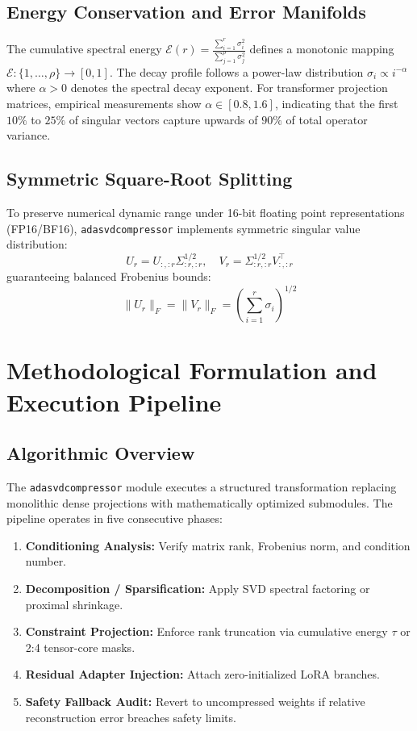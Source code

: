 \documentclass{article}
\begin{document}
\subsection{Energy Conservation and Error Manifolds}
The cumulative spectral energy $\mathcal{E}(r) = \frac{\sum_{i=1}^r \sigma_i^2}{\sum_{j=1}^\rho \sigma_j^2}$ defines a monotonic mapping $\mathcal{E}: \{1, \dots, \rho\} \to [0, 1]$. The decay profile follows a power-law distribution $\sigma_i \propto i^{-\alpha}$ where $\alpha > 0$ denotes the spectral decay exponent. For transformer projection matrices, empirical measurements show $\alpha \in [0.8, 1.6]$, indicating that the first $10\%$ to $25\%$ of singular vectors capture upwards of $90\%$ of total operator variance.

\subsection{Symmetric Square-Root Splitting}
To preserve numerical dynamic range under 16-bit floating point representations (FP16/BF16), \texttt{adasvdcompressor} implements symmetric singular value distribution:
\[
U_r = U_{:, :r} \Sigma_{:r, :r}^{1/2}, \quad V_r = \Sigma_{:r, :r}^{1/2} V_{:, :r}^\top
\]
guaranteeing balanced Frobenius bounds:
\[
\|U_r\|_F = \|V_r\|_F = \left( \sum_{i=1}^{r} \sigma_i \right)^{1/2}
\]


\section{Methodological Formulation and Execution Pipeline}

\subsection{Algorithmic Overview}
The \texttt{adasvdcompressor} module executes a structured transformation replacing monolithic dense projections with mathematically optimized submodules. The pipeline operates in five consecutive phases:
\begin{enumerate}
\item \textbf{Conditioning Analysis:} Verify matrix rank, Frobenius norm, and condition number.
\item \textbf{Decomposition / Sparsification:} Apply SVD spectral factoring or proximal shrinkage.
\item \textbf{Constraint Projection:} Enforce rank truncation via cumulative energy $\tau$ or 2:4 tensor-core masks.
\item \textbf{Residual Adapter Injection:} Attach zero-initialized LoRA branches.
\item \textbf{Safety Fallback Audit:} Revert to uncompressed weights if relative reconstruction error breaches safety limits.
\end{enumerate}
\end{document}
